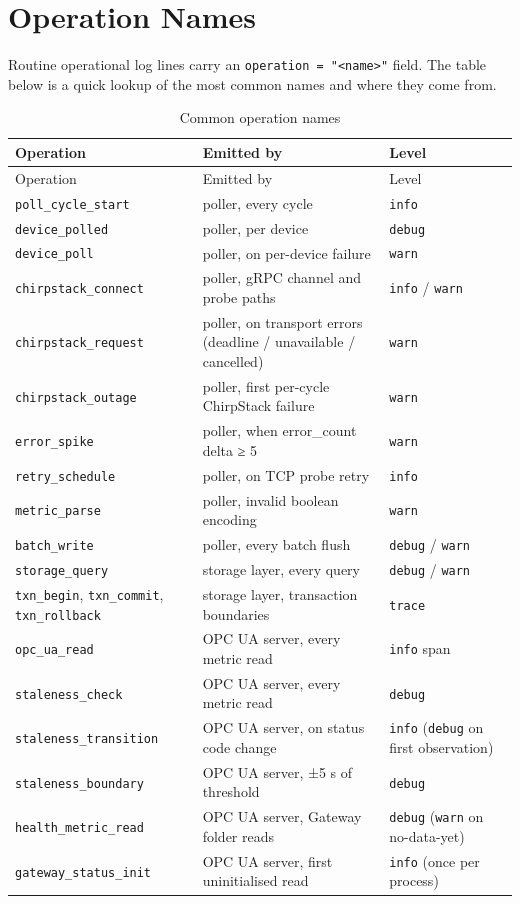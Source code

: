 \chapter{Operation Names}\label{app-operation-names}

Routine operational log lines carry an \texttt{operation\ =\ "\textless{}name\textgreater{}"} field. The table below is a quick lookup of the most common names and where they come from.

\begin{longtable}[]{@{}lll@{}}
\caption{Common operation names}\tabularnewline
\toprule\noalign{}
Operation & Emitted by & Level \\
\midrule\noalign{}
\endfirsthead
\toprule\noalign{}
Operation & Emitted by & Level \\
\midrule\noalign{}
\endhead
\bottomrule\noalign{}
\endlastfoot
\texttt{poll\_cycle\_start} & poller, every cycle & \texttt{info} \\
\texttt{device\_polled} & poller, per device & \texttt{debug} \\
\texttt{device\_poll} & poller, on per-device failure & \texttt{warn} \\
\texttt{chirpstack\_connect} & poller, gRPC channel and probe paths & \texttt{info} / \texttt{warn} \\
\texttt{chirpstack\_request} & poller, on transport errors (deadline / unavailable / cancelled) & \texttt{warn} \\
\texttt{chirpstack\_outage} & poller, first per-cycle ChirpStack failure & \texttt{warn} \\
\texttt{error\_spike} & poller, when error\_count delta ≥ 5 & \texttt{warn} \\
\texttt{retry\_schedule} & poller, on TCP probe retry & \texttt{info} \\
\texttt{metric\_parse} & poller, invalid boolean encoding & \texttt{warn} \\
\texttt{batch\_write} & poller, every batch flush & \texttt{debug} / \texttt{warn} \\
\texttt{storage\_query} & storage layer, every query & \texttt{debug} / \texttt{warn} \\
\texttt{txn\_begin}, \texttt{txn\_commit}, \texttt{txn\_rollback} & storage layer, transaction boundaries & \texttt{trace} \\
\texttt{opc\_ua\_read} & OPC UA server, every metric read & \texttt{info} span \\
\texttt{staleness\_check} & OPC UA server, every metric read & \texttt{debug} \\
\texttt{staleness\_transition} & OPC UA server, on status code change & \texttt{info} (\texttt{debug} on first observation) \\
\texttt{staleness\_boundary} & OPC UA server, ±5 s of threshold & \texttt{debug} \\
\texttt{health\_metric\_read} & OPC UA server, Gateway folder reads & \texttt{debug} (\texttt{warn} on no-data-yet) \\
\texttt{gateway\_status\_init} & OPC UA server, first uninitialised read & \texttt{info} (once per process) \\
\end{longtable}

